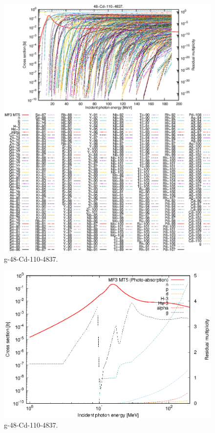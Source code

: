 \begin{figure}
 \includegraphics[width=\linewidth]{eps/g_48-Cd-110_4837.eps}
  \caption{g-48-Cd-110-4837.}
\end{figure}
\newpage \clearpage

\begin{figure}
 \includegraphics[width=\linewidth]{eps-log/g_48-Cd-110_4837.eps}
 \caption{g-48-Cd-110-4837.}
\end{figure}
\newpage \clearpage

